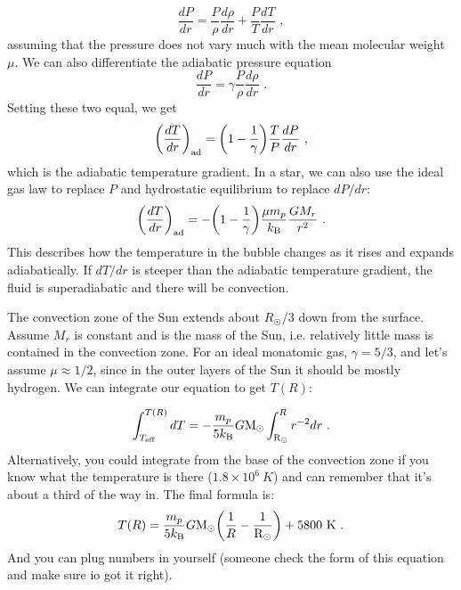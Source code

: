 \begin{enumerate}
	\begin{equation}
	\frac{dP}{dr} = \frac{P}{\rho} \frac{d \rho}{dr} + \frac{P}{T} \frac{d T}{dr} \,\, ,
	\end{equation}
	assuming that the pressure does not vary much with the mean molecular weight $\mu$. We can also differentiate the adiabatic pressure equation
	\begin{equation}
	\frac{dP}{dr} = \gamma \frac{P}{\rho}\frac{d\rho}{dr}\,\, .
	\end{equation}
	Setting these two equal, we get
	\begin{equation}
	\biggl(\frac{dT}{dr}\biggr)_{\rm ad} = \biggl(1 - \frac{1}{\gamma}\biggr)\frac{T}{P} \frac{dP}{dr}\,\, ,
	\end{equation}
	which is the adiabatic temperature gradient. In a star, we can also use the ideal gas law to replace $P$ and hydrostatic equilibrium to replace $dP/dr$:
	\begin{equation}
	\biggl(\frac{dT}{dr}\biggr)_{\rm ad} = -\biggl(1 - \frac{1}{\gamma}\biggr)\frac{\mu m_p}{k_{\rm B}} \frac{G M_r}{r^2}\,\, .
	\end{equation}
	This describes how the temperature in the bubble changes as it rises and expands adiabatically. If $dT/dr$ is steeper than the adiabatic temperature gradient, the fluid is superadiabatic and there will be convection.
	
	The convection zone of the Sun extends about $R_\astrosun/3$ down from the surface. Assume $M_r$ is constant and is the mass of the Sun, i.e. relatively little mass is contained in the convection zone. For an ideal monatomic gas, $\gamma = 5/3$, and let's assume $\mu \approx 1/2$, since in the outer layers of the Sun it should be mostly hydrogen. We can integrate our equation to get $T(R)$:
	
	\begin{equation}
	\int^{T(R)}_{T_{\rm eff}} dT = -\frac{m_p}{5 k_{\rm B}} G {\rm M}_\odot \int^R_{\rm R_\odot} r^{-2}dr \,\, .
	\end{equation}
	Alternatively, you could integrate from the base of the convection zone if you know what the temperature is there ($1.8 \times 10^6~K$) and can remember that it's about a third of the way in. The final formula is:
	\begin{equation}
	T(R) = \frac{m_p}{5 k_{\rm B}} G {\rm M}_\odot \biggl( \frac{1}{R} - \frac{1}{{\rm R}_\odot}\biggr) + 5800~{\rm K}\,\, .
	\end{equation}
	And you can plug numbers in yourself (someone check the form of this equation and make sure io got it right).
	

\end{enumerate}
